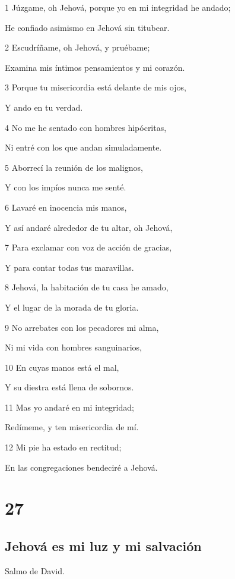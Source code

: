 \par 1 Júzgame, oh Jehová, porque yo en mi integridad he andado;
\par He confiado asimismo en Jehová sin titubear.
\par 2 Escudríñame, oh Jehová, y pruébame;
\par Examina mis íntimos pensamientos y mi corazón.
\par 3 Porque tu misericordia está delante de mis ojos,
\par Y ando en tu verdad.
\par 4 No me he sentado con hombres hipócritas,
\par Ni entré con los que andan simuladamente.
\par 5 Aborrecí la reunión de los malignos,
\par Y con los impíos nunca me senté.
\par 6 Lavaré en inocencia mis manos,
\par Y así andaré alrededor de tu altar, oh Jehová,
\par 7 Para exclamar con voz de acción de gracias,
\par Y para contar todas tus maravillas.
\par 8 Jehová, la habitación de tu casa he amado,
\par Y el lugar de la morada de tu gloria.
\par 9 No arrebates con los pecadores mi alma,
\par Ni mi vida con hombres sanguinarios,
\par 10 En cuyas manos está el mal,
\par Y su diestra está llena de sobornos.
\par 11 Mas yo andaré en mi integridad;
\par Redímeme, y ten misericordia de mí.
\par 12 Mi pie ha estado en rectitud;
\par En las congregaciones bendeciré a Jehová.

\chapter{27}

\section*{Jehová es mi luz y mi salvación}

\par Salmo de David.

